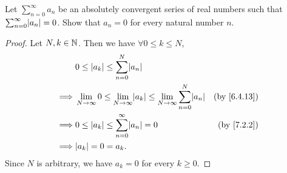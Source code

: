 \begin{ex}\label{ex:7.3.3}
  Let \(\sum_{n = 0}^\infty a_n\) be an absolutely convergent series of real numbers such that \(\sum_{n = 0}^\infty \abs{a_n} = 0\).
  Show that \(a_n = 0\) for every natural number \(n\).
\end{ex}

\begin{proof}
  Let \(N, k \in \mathbb{N}\).
  Then we have \(\forall 0 \leq k \leq N\),
  \begin{align*}
             & 0 \leq \abs{a_k} \leq \sum_{n = 0}^N \abs{a_n}                                                                                         \\
    \implies & \lim_{N \to \infty} 0 \leq \lim_{N \to \infty} \abs{a_k} \leq \lim_{N \to \infty} \sum_{n = 0}^N \abs{a_n} & \text{(by \cref{6.4.13})} \\
    \implies & 0 \leq \abs{a_k} \leq \sum_{n = 0}^\infty \abs{a_n} = 0                                                    & \text{(by \cref{7.2.2})}  \\
    \implies & \abs{a_k} = 0 = a_k.
  \end{align*}
  Since \(N\) is arbitrary, we have \(a_k = 0\) for every \(k \geq 0\).
\end{proof}